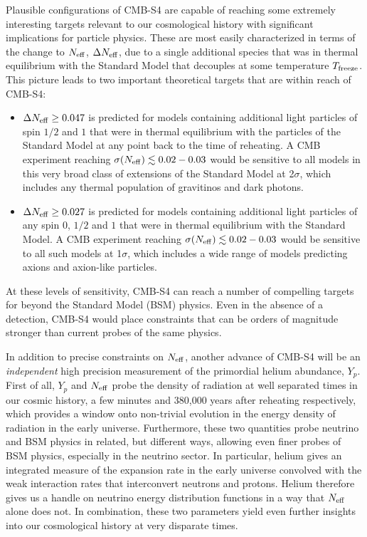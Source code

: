 Plausible configurations of CMB-S4 are capable of reaching some extremely interesting targets relevant to our cosmological history with significant implications for particle physics. These are most easily characterized in terms of the change to $N_{\rm eff}$, $\Delta N_{\rm eff}$, due to a single additional species that was in thermal equilibrium with the Standard Model that decouples at some temperature $T_{\rm freeze}$.  This picture leads to two important theoretical targets that are within reach of CMB-S4:
\begin{itemize}
\item $\Delta N_{\rm eff} \geq 0.047$ is predicted for models containing additional light particles of spin $1/2$ and $1$ that were in thermal equilibrium with the particles of the Standard Model at any point back to the time of reheating.  A CMB experiment reaching $\sigma(N_{\rm eff}) \lesssim 0.02-0.03$ would be sensitive to all models in this very broad class of extensions of the Standard Model at 2$\sigma$, which includes any thermal population of gravitinos and dark photons.  %
\item $\Delta N_{\rm eff} \geq  0.027$ is predicted for models containing additional light particles of any spin $0$, $1/2$ and $1$ that were in thermal equilibrium with the Standard Model.  A CMB experiment reaching $\sigma(N_{\rm eff}) \lesssim 0.02-0.03$ would be sensitive to all such models at 1$\sigma$, which includes a wide range of models predicting axions and axion-like particles. 
\end{itemize}
At these levels of sensitivity, CMB-S4 can reach a number of compelling targets for beyond the Standard Model (BSM) physics.  Even in the absence of a detection, CMB-S4 would place constraints that can be orders of magnitude stronger than current probes of the same physics.

In addition to precise constraints on $N_{\rm eff}$, another advance of CMB-S4 will be an {\it independent} high precision measurement of the primordial helium abundance, $Y_p$. First of all, $Y_p$ and $N_{\rm eff}$ probe the density of radiation at well separated times in our cosmic history, a few minutes and 380,000 years after reheating respectively, which provides a window onto non-trivial evolution in the energy density of radiation in the early universe.  Furthermore, these two quantities probe neutrino and BSM physics in related, but different ways, allowing even finer probes of BSM physics, especially in the neutrino sector.  In particular, helium gives an integrated measure of the expansion rate in the early universe convolved with the weak interaction rates that interconvert neutrons and protons. Helium therefore gives us a handle on neutrino energy distribution functions in a way that $N_{\rm eff}$ alone does not.  In combination, these two parameters yield even further insights into our cosmological history at very disparate times.  

